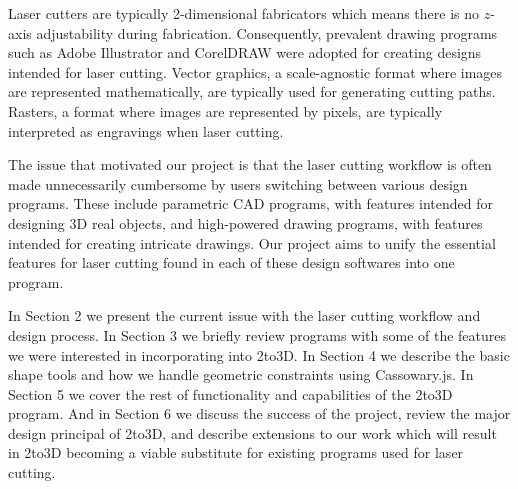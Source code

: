Laser cutters are typically 2-dimensional fabricators which means there is no $z$-axis adjustability during fabrication. Consequently, prevalent drawing programs such as Adobe Illustrator and CorelDRAW were adopted for creating designs intended for laser cutting. Vector graphics, a scale-agnostic format where images are represented mathematically, are typically used for generating cutting paths. Rasters, a format where images are represented by pixels, are typically interpreted as engravings when laser cutting.

The issue that motivated our project is that the laser cutting workflow is often made unnecessarily cumbersome by users switching between various design programs. These include parametric CAD programs, with features intended for designing 3D real objects, and high-powered drawing programs, with features intended for creating intricate drawings. Our project aims to unify the essential features for laser cutting found in each of these design softwares into one program.

In Section 2 we present the current issue with the laser cutting workflow and design process. In Section 3 we briefly review programs with some of the features we were interested in incorporating into 2to3D. In Section 4 we describe the basic shape tools and how we handle geometric constraints using Cassowary.js. In Section 5 we cover the rest of functionality and capabilities of the 2to3D program. And in Section 6 we discuss the success of the project, review the major design principal of 2to3D, and describe extensions to our work which will result in 2to3D becoming a viable substitute for existing programs used for laser cutting. 